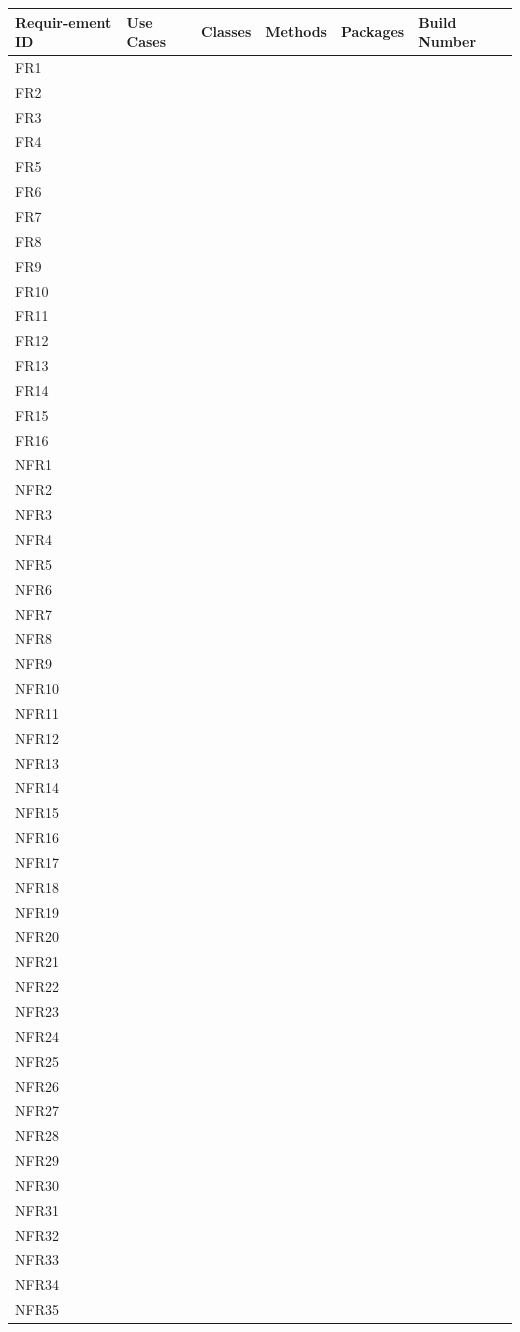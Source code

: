 \documentclass[a4paper,twoside,phd]{BYUPhys}
\begin{document}
{
\begin{longtable}{ |p{1cm}|p{1.5cm}|p{1.5cm}|p{1.5cm}|p{1.5cm}|p{1cm}| }
\hline
\bf{Requir-ement ID} & \bf{Use Cases} & \bf{Classes} & \bf{Methods} & \bf{Packages} & \bf{Build Number}\\
\hline
FR1 & & & & &\\
FR2 & & & & &\\
FR3 & & & & &\\
FR4 & & & & &\\
FR5 & & & & &\\
FR6 & & & & &\\
FR7 & & & & &\\
FR8 & & & & &\\
FR9 & & & & &\\
FR10 & & & & &\\
FR11 & & & & &\\
FR12 & & & & &\\
FR13 & & & & &\\
FR14 & & & & &\\
FR15 & & & & &\\
FR16 & & & & &\\
NFR1 & & & & &\\
NFR2 & & & & &\\
NFR3 & & & & &\\
NFR4 & & & & &\\
NFR5 & & & & &\\
NFR6 & & & & &\\
NFR7 & & & & &\\
NFR8 & & & & &\\
NFR9 & & & & &\\
NFR10 & & & & &\\
NFR11 & & & & &\\
NFR12 & & & & &\\
NFR13 & & & & &\\
NFR14 & & & & &\\
NFR15 & & & & &\\
NFR16 & & & & &\\
NFR17 & & & & &\\
NFR18 & & & & &\\
NFR19 & & & & &\\
NFR20 & & & & &\\
NFR21 & & & & &\\
NFR22 & & & & &\\
NFR23 & & & & &\\
NFR24 & & & & &\\
NFR25 & & & & &\\
NFR26 & & & & &\\
NFR27 & & & & &\\
NFR28 & & & & &\\
NFR29 & & & & &\\
NFR30 & & & & &\\
NFR31 & & & & &\\
NFR32 & & & & &\\
NFR33 & & & & &\\
NFR34 & & & & &\\
NFR35 & & & & &\\
\hline
\end{longtable}
}
\label{chap:Conclusions}
\end{document}
